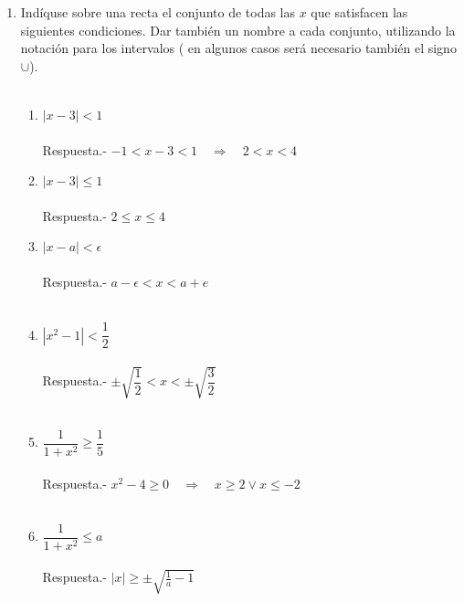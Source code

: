\begin{enumerate}[\bfseries 1.]

    \item Indíquse sobre una recta el conjunto de todas las $x$ que satisfacen las siguientes condiciones. Dar también un nombre a cada conjunto, utilizando la notación para los intervalos ( en algunos casos será necesario también el signo $\cup$).\\\\
    \begin{enumerate}[\bfseries (i)]
	
	\item $|x-3| < 1$\\\\
	    Respuesta.-\; $-1< x-3 <1 \quad \Longrightarrow \quad 2 < x < 4$\\

	\item $|x-3|\leq 1$\\\\
	    Respuesta.-\; $2 \leq x \leq 4$\\

	\item $|x-a| < \epsilon$\\\\
	    Respuesta.-\; $a-\epsilon < x < a+e$\\\\
	
	\item $|x^2 - 1| < \dfrac{1}{2}$\\\\
	    Respuesta.-\; $\pm\sqrt{\dfrac{1}{2}} < x < \pm \sqrt{\dfrac{3}{2}}$\\\\

	\item $\dfrac{1}{1+x^2} \geq \dfrac{1}{5}$\\\\
	    Respuesta.-\; $x^2-4\geq 0 \quad \Longrightarrow \quad x\geq 2 \lor x\leq -2$\\\\

	\item $\dfrac{1}{1+x^2} \leq a$\\\\
	    Respuesta.-\; $|x| \geq \pm \sqrt{\frac{1}{a}-1}$\\\\


\end{enumerate}
\end{enumerate}
